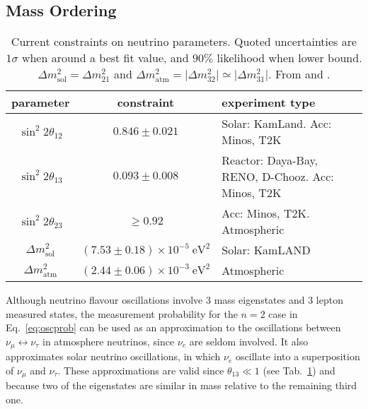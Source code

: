 \subsection{Mass Ordering}
\label{sec:massorder}

\begin{table}
	\begin{center}
		\begin{tabular}{ccl}
			\toprule
			\textbf{parameter} & \textbf{constraint} & \textbf{experiment type} \\
			\midrule
			$\sin^2 2 \theta_{12}$ & $0.846 \pm 0.021$ & Solar: KamLand. Acc: Minos, T2K\\
			$\sin^2 2 \theta_{13}$ & $0.093 \pm 0.008$ & Reactor: Daya-Bay, RENO, D-Chooz. Acc: Minos, T2K\\
			$\sin^2 2 \theta_{23}$ & $\geqslant 0.92$ & Acc: Minos, T2K. Atmospheric \\
			$\Delta m^2_{\mathrm{sol}}$ & $(7.53 \pm 0.18) \times 10^{-5}~\mathrm{eV}^2$ & Solar: KamLAND \\
			$\Delta m^2_{\mathrm{atm}}$ & $(2.44 \pm 0.06) \times 10^{-3}~\mathrm{eV}^2$ & Atmospheric \\
			\bottomrule
		\end{tabular}
	\end{center}
	\caption{Current constraints on neutrino parameters. Quoted uncertainties are $1 \sigma$ when around a best fit value, and $90\%$ likelihood when lower bound. $\Delta m^2_{\mathrm{sol}} = \Delta m^2_{21}$ and $\Delta m^2_{\mathrm{atm}} = \vert \Delta m^2_{32} \vert \simeq \vert \Delta m^2_{31} \vert$. From \cite{PDG} and \cite{W_decay_width}.}
	\label{tab:neutrinoparamexp}
\end{table}

Although neutrino flavour oscillations involve $3$ mass eigenstates and $3$ lepton measured states, the measurement probability for the $n=2$ case in Eq.~\ref{eq:oscprob} can be used as an approximation to the oscillations between $\nu_{\mu} \longleftrightarrow \nu_{\tau}$ in atmosphere neutrinos, since $\nu_e$ are seldom involved. It also approximates solar neutrino oscillations, in which $\nu_e$ oscillate into a superposition of $\nu_\mu$ and $\nu_\tau$. These approximations are valid since $\theta_{13} \ll 1$ (see Tab.~\ref{tab:neutrinoparamexp}) and because two of the eigenstates are similar in mass relative to the remaining third one. \\

